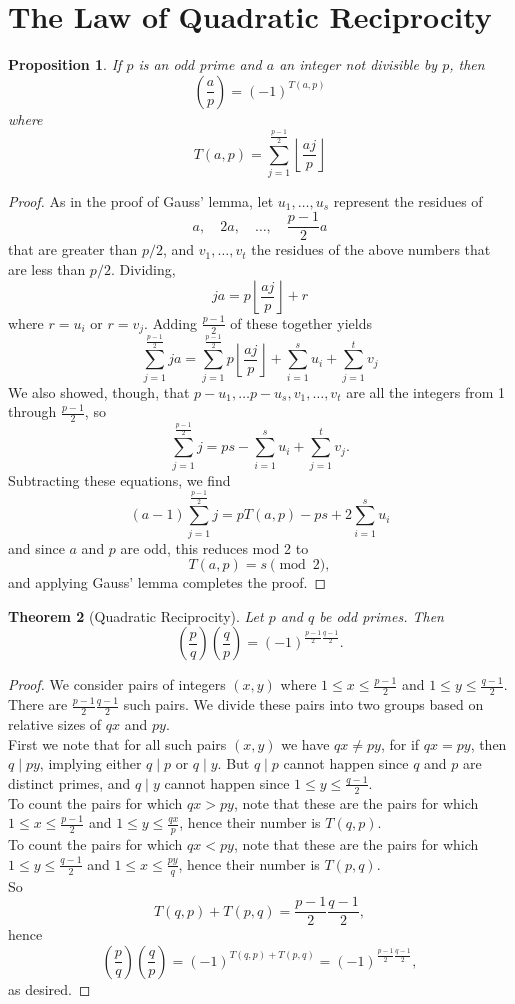 \documentclass{amsbook}
\numberwithin{section}{chapter}
\theoremstyle{plain}
\newtheorem{thm}{Theorem}[section]
\newtheorem{prop}[thm]{Proposition}
\theoremstyle{definition}
\def\br{~\\[1em]}
\begin{document}
\section{The Law of Quadratic Reciprocity}
\begin{prop}
If $p$ is an odd prime and $a$ an integer not divisible by $p$,
then
\[\left(\frac{a}{p}\right) = (-1)^{T(a, p)}\]
where
\[T(a, p) = \sum_{j=1}^\frac{p-1}{2}
\left\lfloor\frac{aj}{p}\right\rfloor\]
\end{prop}
\begin{proof}
As in the proof of Gauss' lemma, let $u_1,\dots, u_s$
represent the residues of
\[a,\quad 2a,\quad\dots,\quad\frac{p-1}{2}a\]
that are greater than $p/2$, and $v_1,\dots,v_t$ the
residues of the above numbers that are less than $p/2$.
Dividing,
\[ja = p\left\lfloor\frac{aj}{p}\right\rfloor + r\]
where $r = u_i$ or $r = v_j$.
Adding $\frac{p-1}{2}$ of these together yields
\[\sum_{j=1}^\frac{p-1}{2}ja
= \sum_{j=1}^\frac{p-1}{2}p\left\lfloor\frac{aj}{p}\right\rfloor
+ \sum_{i=1}^su_i + \sum_{j=1}^tv_j \]
We also showed, though, that $p - u_1,\dots p - u_s, v_1,\dots, v_t$
are all the integers from 1 through $\frac{p-1}{2}$, so
\[\sum_{j=1}^\frac{p-1}{2}j = ps
- \sum_{i=1}^su_i + \sum_{j=1}^tv_j.\]
Subtracting these equations, we find
\[(a - 1)\sum_{j=1}^\frac{p-1}{2}j
= pT(a, p) - ps + 2\sum_{i=1}^su_i\]
and since $a$ and $p$ are odd, this reduces mod 2 to
\[T(a, p) = s\pmod 2,\]
and applying Gauss' lemma completes the proof.
\end{proof}
\begin{thm}[Quadratic Reciprocity]
Let $p$ and $q$ be odd primes. Then
\[\left(\frac{p}{q}\right)\left(\frac{q}{p}\right)
= (-1)^{\frac{p-1}{2}\frac{q-1}{2}}.\]
\end{thm}
\begin{proof}
We consider pairs of integers $(x, y)$ where $1\le x\le\frac{p-1}{2}$
and $1\le y\le \frac{q-1}{2}$. There are $\frac{p-1}{2}\frac{q-1}{2}$
such pairs. We divide these pairs into two groups based on relative
sizes of $qx$ and $py$.
\br
First we note that for all such pairs $(x, y)$ we have $qx\ne py$, for
if $qx = py$, then $q\mid py$, implying either $q\mid p$ or $q\mid y$.
But $q\mid p$ cannot happen since $q$ and $p$ are distinct primes,
and $q\mid y$ cannot happen since $1\le y\le \frac{q-1}{2}$.
\br
To count the pairs for which $qx >  py$,
note that these are the pairs for
which $1\le x\le \frac{p-1}{2}$ and $1\le y\le\frac{qx}{p}$, hence
their number is $T(q, p)$.
\br
To count the pairs for which $qx <  py$,
note that these are the pairs for
which $1\le y\le \frac{q-1}{2}$ and $1\le x\le\frac{py}{q}$, hence
their number is $T(p, q)$.
\br
So 
\[T(q, p) + T(p, q) = \frac{p-1}{2}\frac{q-1}{2},\]
hence
\[\left(\frac{p}{q}\right)\left(\frac{q}{p}\right)
= (-1)^{T(q, p) + T(p, q)}
= (-1)^{\frac{p-1}{2}\frac{q-1}{2}},\]
as desired.
\end{proof}
\end{document}
